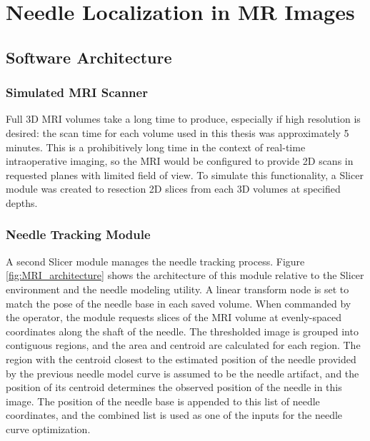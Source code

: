 %
%
%


\chapter{Needle Localization in MR Images}
\label{sec:mritracking} %

\section{Software Architecture}
\subsection{Simulated MRI Scanner}
Full 3D MRI volumes take a long time to produce, especially if high resolution is desired: the scan time for each volume used in this thesis was approximately 5 minutes. This is a prohibitively long time in the context of real-time intraoperative imaging, so the MRI would be configured to provide 2D scans in requested planes with limited field of view. To simulate this functionality, a  Slicer module was created to resection 2D slices from each 3D volumes at specified depths.

\subsection{Needle Tracking Module}
A second Slicer module manages the needle tracking process. Figure \ref{fig:MRI_architecture} shows the architecture of this module relative to the Slicer environment and the needle modeling utility. A linear transform node is set to match the pose of the needle base in each saved volume. When commanded by the operator, the module requests slices of the MRI volume at evenly-spaced coordinates along the shaft of the needle. The thresholded image is grouped into contiguous regions, and the area and centroid are calculated for each region. The region with the centroid closest to the estimated position of the needle provided by the previous needle model curve is assumed to be the needle artifact, and the position of its centroid determines the observed position of the needle in this image. The position of the needle base is appended to this list of needle coordinates, and the combined list is used as one of the inputs for the needle curve optimization.

